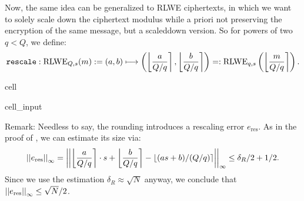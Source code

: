 \documentclass[letterpaper,10pt,english]{jupyterBook}
\begin{document}
\sphinxAtStartPar
Now, the same idea can be generalized to RLWE ciphertexts, in which we want to solely scale down the ciphertext modulus while a priori not preserving the encryption of the same message, but a scaled\sphinxhyphen{}down version.
So for powers of two \(q < Q\), we define:
\begin{equation*}
\begin{split}\texttt{rescale}: \mathrm{RLWE}_{Q,s}(m) := (a,b) \longmapsto \left(\left\lfloor  \frac{a}{Q/q} \right\rceil , \left\lfloor  \frac{b}{Q/q}  \right\rceil \right)  =: \mathrm{RLWE}_{q,s}\left(\left\lfloor \frac{m}{Q/q}  \right\rceil\right).\end{split}
\end{equation*}
\begin{sphinxuseclass}{cell}\begin{sphinxVerbatimInput}

\begin{sphinxuseclass}{cell_input}
\begin{sphinxVerbatim}[commandchars=\\\{\}]
   
        
     \PYG{p}{[}\PYG{p}{[}\PYG{p}{]}  \PYG{p}{[}\PYG{p}{]} \PYG{p}{]}
\end{sphinxVerbatim}

\end{sphinxuseclass}\end{sphinxVerbatimInput}

\end{sphinxuseclass}
\sphinxAtStartPar
Remark:
Needless to say, the rounding introduces a rescaling error \(e_{\text{res}}\).
As in the proof of {\hyperref[\detokenize{Thesis:relinearization-error}]{}}, we can estimate its size via:
\begin{equation*}
\begin{split}\left\lvert\left\lvert e_{\text{res}} \right\rvert\right\rvert_\infty = \left\lvert\left\lvert  \left\lfloor  \frac{a}{Q/q} \right\rceil \cdot s + \left\lfloor  \frac{b}{Q/q}  \right\rceil - \left\lfloor (as+b)/(Q/q) \right\rceil  \right\rvert\right\rvert_\infty \le \delta_R/2 + 1/2.\end{split}
\end{equation*}
\sphinxAtStartPar
Since we use the estimation \(\delta_R \approx \sqrt{N}\) anyway, we conclude that \(\left\lvert\left\lvert e_{\text{res}} \right\rvert\right\rvert_\infty \le \sqrt{N}/2\).
\end{document}
